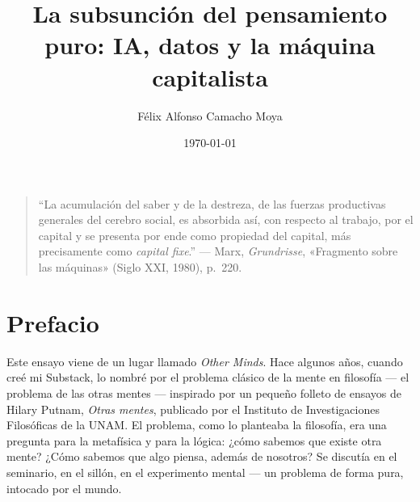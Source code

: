 \documentclass[11pt]{article}
\title{La subsunción del pensamiento puro: IA, datos y la máquina capitalista}
\author{Félix Alfonso Camacho Moya}
\date{\today}
\begin{document}
\maketitle

\begin{abstract}
\end{abstract}

\begin{quote}
\enquote{La acumulación del saber y de la destreza, de las fuerzas
productivas generales del cerebro social, es absorbida así, con respecto
al trabajo, por el capital y se presenta por ende como propiedad del
capital, más precisamente como \textit{capital fixe}.}
--- Marx, \textit{Grundrisse}, «Fragmento sobre las máquinas» (Siglo XXI,
1980), p.~220.
\end{quote}

\section*{Prefacio}

Este ensayo viene de un lugar llamado \emph{Other Minds}. Hace algunos
años, cuando creé mi Substack, lo nombré por el problema clásico de la
mente en filosofía --- el problema de las otras mentes --- inspirado por
un pequeño folleto de ensayos de Hilary Putnam, \textit{Otras mentes},
publicado por el Instituto de Investigaciones Filosóficas de la UNAM.
El problema, como lo planteaba la filosofía, era una pregunta para la
metafísica y para la lógica: ¿cómo sabemos que existe otra mente? ¿Cómo
sabemos que algo piensa, además de nosotros? Se discutía en el
seminario, en el sillón, en el experimento mental --- un problema de
forma pura, intocado por el mundo.
\end{document}
